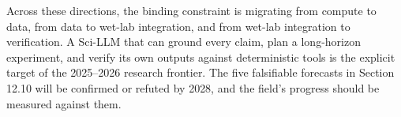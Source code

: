 \documentclass{article}
\begin{document}
Across these directions, the binding constraint is migrating from compute to data, from data to wet-lab integration, and from wet-lab integration to verification. A Sci-LLM that can ground every claim, plan a long-horizon experiment, and verify its own outputs against deterministic tools is the explicit target of the 2025--2026 research frontier. The five falsifiable forecasts in Section 12.10 will be confirmed or refuted by 2028, and the field's progress should be measured against them.



\end{document}
